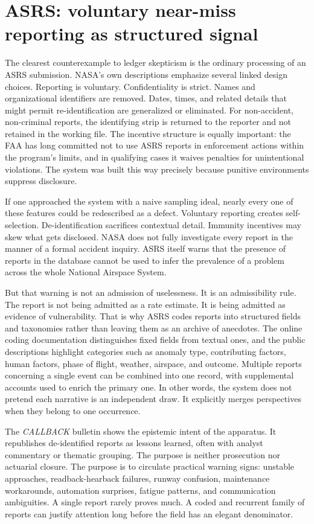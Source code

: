 \documentclass[11pt]{article}
\begin{document}
\section{ASRS: voluntary near-miss reporting as structured signal}
The clearest counterexample to ledger skepticism is the ordinary processing of an ASRS submission. NASA's own descriptions emphasize several linked design choices. Reporting is voluntary. Confidentiality is strict. Names and organizational identifiers are removed. Dates, times, and related details that might permit re-identification are generalized or eliminated. For non-accident, non-criminal reports, the identifying strip is returned to the reporter and not retained in the working file. The incentive structure is equally important: the FAA has long committed not to use ASRS reports in enforcement actions within the program's limits, and in qualifying cases it waives penalties for unintentional violations. The system was built this way precisely because punitive environments suppress disclosure.

If one approached the system with a naive sampling ideal, nearly every one of these features could be redescribed as a defect. Voluntary reporting creates self-selection. De-identification sacrifices contextual detail. Immunity incentives may skew what gets disclosed. NASA does not fully investigate every report in the manner of a formal accident inquiry. ASRS itself warns that the presence of reports in the database cannot be used to infer the prevalence of a problem across the whole National Airspace System.

But that warning is not an admission of uselessness. It is an admissibility rule. The report is not being admitted as a rate estimate. It is being admitted as evidence of vulnerability. That is why ASRS codes reports into structured fields and taxonomies rather than leaving them as an archive of anecdotes. The online coding documentation distinguishes fixed fields from textual ones, and the public descriptions highlight categories such as anomaly type, contributing factors, human factors, phase of flight, weather, airspace, and outcome. Multiple reports concerning a single event can be combined into one record, with supplemental accounts used to enrich the primary one. In other words, the system does not pretend each narrative is an independent draw. It explicitly merges perspectives when they belong to one occurrence.

The \textit{CALLBACK} bulletin shows the epistemic intent of the apparatus. It republishes de-identified reports as lessons learned, often with analyst commentary or thematic grouping. The purpose is neither prosecution nor actuarial closure. The purpose is to circulate practical warning signs: unstable approaches, readback-hearback failures, runway confusion, maintenance workarounds, automation surprises, fatigue patterns, and communication ambiguities. A single report rarely proves much. A coded and recurrent family of reports can justify attention long before the field has an elegant denominator.
\end{document}
